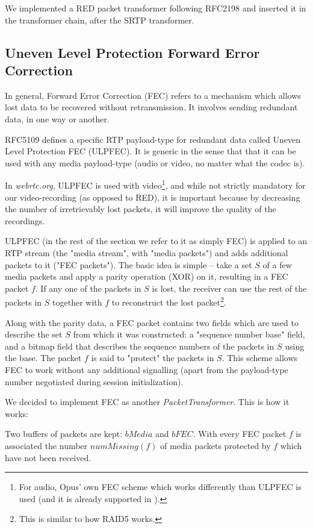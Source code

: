 \documentclass[twoside,openright,a4paper,12pt,english]{article}
\begin{document}
We implemented a RED packet transformer following RFC2198 and inserted it in
the transformer chain, after the SRTP transformer.




\subsection{Uneven Level Protection Forward Error Correction}
\label{ulpfec}
In general, Forward Error Correction (FEC) refers to a mechanism which allows
lost data to be recovered without retransmission. It involves sending redundant
data, in one way or another.

RFC5109\cite{ulpfec} defines a specific RTP payload-type for
redundant data called Uneven Level Protection FEC (ULPFEC). It is generic in
the sense that that it can be used with any media payload-type
(audio or video, no matter what the codec is). 

In \emph{webrtc.org},
ULPFEC is used with video\footnote{For audio, Opus' own FEC scheme which works
differently than ULPFEC is used (and it is already supported in \lj).},
and while not strictly mandatory for our video-recording (as opposed to RED),
it is important because by decreasing the number of irretrievably lost packets,
it will improve the quality of the recordings.

ULPFEC (in the rest of the section we refer to it as simply FEC) is applied to
an RTP stream (the "media stream", with "media packets")
and adds additional packets to it ("FEC packets"). The basic idea is simple --
take a set $S$ of a few media packets and apply a parity operation (XOR) on it,
resulting in a FEC packet $f$. If any one of the packets in $S$ is lost,
the receiver can use the rest of the packets in $S$ together with $f$ to reconstruct the
lost packet\footnote{This is similar to how RAID5 works.}. 

Along with the parity data, a FEC packet contains two fields which are used to
describe the set $S$ from which it was constructed: a "sequence number base"
field, and a bitmap field that describes the sequence numbers of the packets in
$S$ using the base. The packet $f$ is said to "protect" the packets in $S$. This scheme 
allows FEC to work without any additional
signalling (apart from the payload-type number negotiated during session
initialization). 

\medskip
We decided to implement FEC as another \emph{PacketTransformer}. This is how it works:

Two buffers of packets are kept: $bMedia$ and $bFEC$. With every FEC packet $f$
is associated the number $numMissing(f)$ of media packets protected by $f$
which have not been received.
\end{document}

